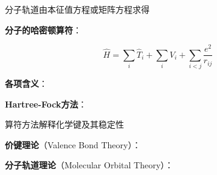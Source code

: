
\begin{frame}{分子轨道由本征值方程或矩阵方程求得}

  
    \begin{iqbitemize}
    \item \textbf{分子的哈密顿算符}：
    \end{iqbitemize}
    \[
      \hat{H} = \sum_i \hat{T}_i + \sum_i V_i + \sum_{i<j} \dfrac{e^2}{r_{ij}}
    \]
    \begin{iqbitemize}
    \item \textbf{各项含义}：

    \item \textbf{Hartree-Fock方法}：
    \end{iqbitemize}

    \iqbsmallsep

    \end{frame}

\begin{frame}{算符方法解释化学键及其稳定性}

  
    \begin{iqbitemize}
    \item \textbf{价键理论}（Valence Bond Theory）：

    \item \textbf{分子轨道理论}（Molecular Orbital Theory）：
    \end{iqbitemize}

  
\end{frame}

